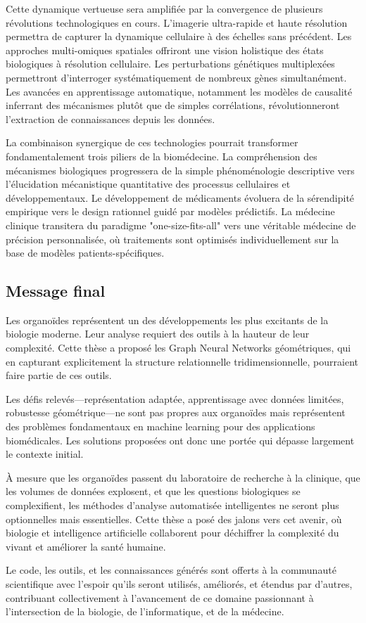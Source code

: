 Cette dynamique vertueuse sera amplifiée par la convergence de plusieurs révolutions technologiques en cours. L'imagerie ultra-rapide et haute résolution permettra de capturer la dynamique cellulaire à des échelles sans précédent. Les approches multi-omiques spatiales offriront une vision holistique des états biologiques à résolution cellulaire. Les perturbations génétiques multiplexées permettront d'interroger systématiquement de nombreux gènes simultanément. Les avancées en apprentissage automatique, notamment les modèles de causalité inferrant des mécanismes plutôt que de simples corrélations, révolutionneront l'extraction de connaissances depuis les données.

La combinaison synergique de ces technologies pourrait transformer fondamentalement trois piliers de la biomédecine. La compréhension des mécanismes biologiques progressera de la simple phénoménologie descriptive vers l'élucidation mécanistique quantitative des processus cellulaires et développementaux. Le développement de médicaments évoluera de la sérendipité empirique vers le design rationnel guidé par modèles prédictifs. La médecine clinique transitera du paradigme "one-size-fits-all" vers une véritable médecine de précision personnalisée, où traitements sont optimisés individuellement sur la base de modèles patients-spécifiques.

\subsection{Message final}

Les organoïdes représentent un des développements les plus excitants de la biologie moderne. Leur analyse requiert des outils à la hauteur de leur complexité. Cette thèse a proposé les Graph Neural Networks géométriques, qui en capturant explicitement la structure relationnelle tridimensionnelle, pourraient faire partie de ces outils.

Les défis relevés—représentation adaptée, apprentissage avec données limitées, robustesse géométrique—ne sont pas propres aux organoïdes mais représentent des problèmes fondamentaux en machine learning pour des applications biomédicales. Les solutions proposées ont donc une portée qui dépasse largement le contexte initial.

À mesure que les organoïdes passent du laboratoire de recherche à la clinique, que les volumes de données explosent, et que les questions biologiques se complexifient, les méthodes d'analyse automatisée intelligentes ne seront plus optionnelles mais essentielles. Cette thèse a posé des jalons vers cet avenir, où biologie et intelligence artificielle collaborent pour déchiffrer la complexité du vivant et améliorer la santé humaine.

Le code, les outils, et les connaissances générés sont offerts à la communauté scientifique avec l'espoir qu'ils seront utilisés, améliorés, et étendus par d'autres, contribuant collectivement à l'avancement de ce domaine passionnant à l'intersection de la biologie, de l'informatique, et de la médecine.
